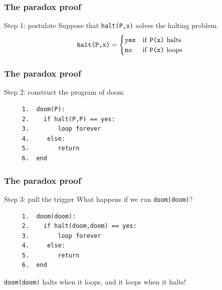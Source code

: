 \documentclass[handout, 12pt]{beamer}
\begin{document}
\begin{frame}

\frametitle{The paradox proof}

\begin{block}{Step 1: postulate}
\pause
Suppose that \texttt{halt(P,x)} solves the halting problem.
\begin{equation*}
\texttt{halt(P,x)} = \begin{cases}
\texttt{yes} & \text{if \texttt{P(x)} halts} \\
\texttt{no} & \text{if \texttt{P(x)} loops} \\
\end{cases}
\end{equation*}
\end{block}

\end{frame}

\begin{frame}[fragile]

\frametitle{The paradox proof}
\begin{block}{Step 2: construct the program of doom}
\pause
\begin{verbatim}
     1.  doom(P):
     2.    if halt(P,P) == yes:
     3.        loop forever
     4.     else:
     5.        return
     6.  end
\end{verbatim}
\end{block}

\end{frame}

\begin{frame}[fragile]

\frametitle{The paradox proof}

\begin{block}{Step 3: pull the trigger}
\pause
What happens if we run \texttt{doom(doom)}?
\pause
\begin{verbatim}
     1.  doom(doom):
     2.    if halt(doom,doom) == yes:
     3.        loop forever
     4.     else:
     5.        return
     6.  end
\end{verbatim}
\pause
\texttt{doom(doom)} halts when it loops, and it loops when it halts!
\end{block}

\end{frame}
\end{document}
